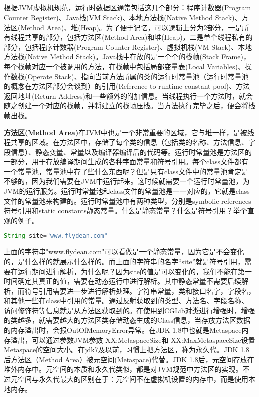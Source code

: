 \documentclass[../../../interview-questions.tex]{subfiles}
\begin{document}
\subsection{\color{red}{Java内存结构}}

根据JVM虚拟机规范，运行时数据区通常包括这几个部分：程序计数器(Program Counter Register)、Java栈(VM Stack)、本地方法栈(Native Method Stack)、方法区(Method Area)、堆(Heap)。为了便于记忆，可以逻辑上分为2部分，一是所有线程共享的部分，包括方法区(Method Area)和堆(Heap)，二是单个线程私有的部分，包括程序计数器(Program Counter Register)、虚拟机栈(VM Stack)、本地方法栈(Native Method Stack)。Java栈中存放的是一个个的栈帧(Stack Frame)，每个栈帧对应一个被调用的方法，在栈帧中包括局部变量表(Local Variables)、操作数栈(Operate Stack)、指向当前方法所属的类的运行时常量池（运行时常量池的概念在方法区部分会谈到）的引用(Reference to runtime constant pool)、方法返回地址(Return Address)和一些额外的附加信息。当线程执行一个方法时，就会随之创建一个对应的栈帧，并将建立的栈帧压栈。当方法执行完毕之后，便会将栈帧出栈。

\textbf{方法区(Method Area)}在JVM中也是一个非常重要的区域，它与堆一样，是被线程共享的区域。在方法区中，存储了每个类的信息（包括类的名称、方法信息、字段信息）、静态变量、常量以及编译器编译后的代码等。运行时常量池是方法区的一部分，用于存放编译期间生成的各种字面常量和符号引用。每个class文件都有一个常量池，常量池中存了些什么东西呢？但是只有class文件中的常量池肯定是不够的，因为我们需要在JVM中运行起来。这时候就需要一个运行时常量池，为JVM的运行服务。运行时常量池和class文件的常量池是一一对应的，它就是class文件的常量池来构建的。运行时常量池中有两种类型，分别是symbolic references符号引用和static constants静态常量。什么是静态常量？什么是符号引用？举个直观的例子。

\begin{lstlisting}[language=Java]
String site="www.flydean.com"
\end{lstlisting}

上面的字符串"www.flydean.com"可以看做是一个静态常量，因为它是不会变化的，是什么样的就展示什么样的。而上面的字符串的名字“site”就是符号引用，需要在运行期间进行解析，为什么呢？因为site的值是可以变化的，我们不能在第一时间确定其真正的值，需要在动态运行中进行解析。其中静态常量不需要后续解析，而符号引用需要进一步进行解析处理。字符串常量，类和接口名字，字段名，和其他一些在class中引用的常量。通过反射获取到的类型、方法名、字段名称、访问修饰符等信息就是从方法区获取到的。在使用到CGLib对类进行增强时，增强的类越多，就需要越大的方法区类存储动态生成的Class信息，当存放方法区数据的内存溢出时，会报OutOfMemoryError异常。在JDK 1.8中也就是Metaspace内存溢出，可以通过参数JVM参数-XX:MetaspaceSize和-XX:MaxMetaspaceSize设置Metaspace的空间大小。在jdk7及以前，习惯上把方法区，称为永久代。JDK 1.8后方法区（Method Area）被元空间(Metaspace)代替。JDK 1.8后，元空间存放在堆外内存中。元空间的本质和永久代类似，都是对JVM规范中方法区的实现。不过元空间与永久代最大的区别在于：元空间不在虚拟机设置的内存中，而是使用本地内存。
\end{document}
